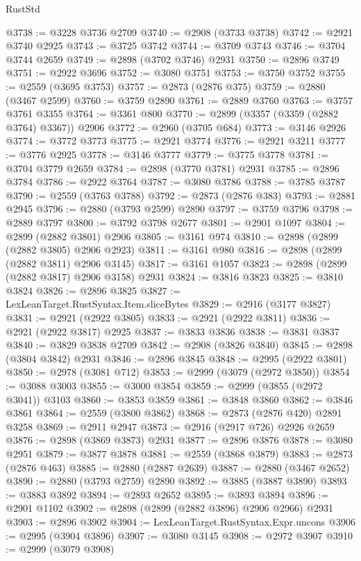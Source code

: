 \begin{lexlean}{RustStd}
\begin{coremodule}
@3738 := @3228 @3736 @2709
@3740 := @2908 (@3733 @3738)
@3742 := @2921 @3740 @2925
@3743 := @3725 @3742
@3744 := @3709 @3743
@3746 := @3704 @3744 @2659
@3749 := @2898 (@3702 @3746) @2931
@3750 := @2896 @3749
@3751 := @2922 @3696
@3752 := @3080 @3751
@3753 := @3750 @3752
@3755 := @2559 (@3695 @3753)
@3757 := @2873 (@2876 @375)
@3759 := @2880 (@3467 @2599)
@3760 := @3759 @2890
@3761 := @2889 @3760
@3763 := @3757 @3761 @3355
@3764 := @3361 @800
@3770 := @2899 (@3357 (@3359 (@2882 @3764) @3367)) @2906
@3772 := @2960 (@3705 @684)
@3773 := @3146 @2926
@3774 := @3772 @3773
@3775 := @2921 @3774
@3776 := @2921 @3211
@3777 := @3776 @2925
@3778 := @3146 @3777
@3779 := @3775 @3778
@3781 := @3704 @3779 @2659
@3784 := @2898 (@3770 @3781) @2931
@3785 := @2896 @3784
@3786 := @2922 @3764
@3787 := @3080 @3786
@3788 := @3785 @3787
@3790 := @2559 (@3763 @3788)
@3792 := @2873 (@2876 @383)
@3793 := @2881 @2945
@3796 := @2880 (@3793 @2599) @2890
@3797 := @3759 @3796
@3798 := @2889 @3797
@3800 := @3792 @3798 @2677
@3801 := @2901 @1097
@3804 := @2899 (@2882 @3801) @2906
@3805 := @3161 @974
@3810 := @2898 (@2899 (@2882 @3805) @2906 @2923)
@3811 := @3161 @980
@3816 := @2898 (@2899 (@2882 @3811) @2906 @3145)
@3817 := @3161 @1057
@3823 := @2898 (@2899 (@2882 @3817) @2906 @3158) @2931
@3824 := @3816 @3823
@3825 := @3810 @3824
@3826 := @2896 @3825
@3827 := LexLeanTarget.RustSyntax.Item.sliceBytes
@3829 := @2916 (@3177 @3827)
@3831 := @2921 (@2922 @3805)
@3833 := @2921 (@2922 @3811)
@3836 := @2921 (@2922 @3817) @2925
@3837 := @3833 @3836
@3838 := @3831 @3837
@3840 := @3829 @3838 @2709
@3842 := @2908 (@3826 @3840)
@3845 := @2898 (@3804 @3842) @2931
@3846 := @2896 @3845
@3848 := @2995 (@2922 @3801)
@3850 := @2978 (@3081 @712)
@3853 := @2999 (@3079 (@2972 @3850))
@3854 := @3088 @3003
@3855 := @3000 @3854
@3859 := @2999 (@3855 (@2972 @3041)) @3103
@3860 := @3853 @3859
@3861 := @3848 @3860
@3862 := @3846 @3861
@3864 := @2559 (@3800 @3862)
@3868 := @2873 (@2876 @420) @2891 @3258
@3869 := @2911 @2947
@3873 := @2916 (@2917 @726) @2926 @2659
@3876 := @2898 (@3869 @3873) @2931
@3877 := @2896 @3876
@3878 := @3080 @2951
@3879 := @3877 @3878
@3881 := @2559 (@3868 @3879)
@3883 := @2873 (@2876 @463)
@3885 := @2880 (@2887 @2639)
@3887 := @2880 (@3467 @2652)
@3890 := @2880 (@3793 @2759) @2890
@3892 := @3885 (@3887 @3890)
@3893 := @3883 @3892
@3894 := @2893 @2652
@3895 := @3893 @3894
@3896 := @2901 @1102
@3902 := @2898 (@2899 (@2882 @3896) @2906 @2966) @2931
@3903 := @2896 @3902
@3904 := LexLeanTarget.RustSyntax.Expr.uncons
@3906 := @2995 (@3904 @3896)
@3907 := @3080 @3145
@3908 := @2972 @3907
@3910 := @2999 (@3079 @3908)

\end{coremodule}
\end{lexlean}
